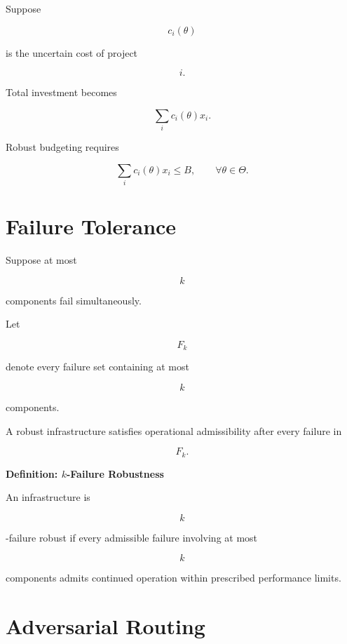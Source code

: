 \documentclass[11pt,fleqn]{book}
\numberwithin{equation}{chapter}
\newenvironment{definition}[1]
  {\begin{definitionEnv}
   \noindent\textbf{Definition: #1}\par\smallskip}
  {\end{definitionEnv}}
\theoremstyle{plain}
\theoremstyle{definition}
\theoremstyle{remark}
\begin{document}
Suppose

\[
c_i(\theta)
\]

is the uncertain cost of project

\[
i.
\]

Total investment becomes

\[
\sum_i
c_i(\theta)x_i.
\]

Robust budgeting requires

\[
\sum_i
c_i(\theta)x_i
\le
B,
\qquad
\forall\theta\in\Theta.
\]


\section{Failure Tolerance}

Suppose at most

\[
k
\]

components fail simultaneously.

Let

\[
F_k
\]

denote every failure set containing at most

\[
k
\]

components.


A robust infrastructure satisfies operational admissibility after every
failure in

\[
F_k.
\]


\begin{definition}{\(k\)-Failure Robustness}

An infrastructure is

\[
k
\]

-failure robust if every admissible failure involving at most

\[
k
\]

components admits continued operation within prescribed performance
limits.

\end{definition}


\section{Adversarial Routing}
\end{document}

